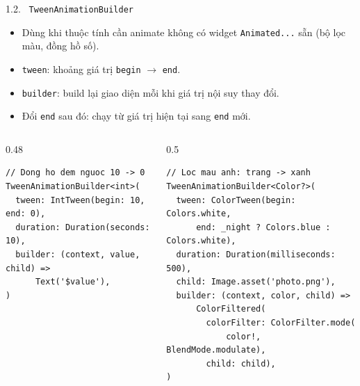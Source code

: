 \documentclass[aspectratio=169,10pt]{beamer}
\begin{document}
\begin{frame}[fragile]{1.2. \texttt{ TweenAnimationBuilder}}
  \begin{itemize}
    \item Dùng khi thuộc tính cần animate không có widget \texttt{Animated...} sẵn
          (bộ lọc màu, đồng hồ số).
    \item \texttt{tween}: khoảng giá trị \texttt{begin} $\rightarrow$ \texttt{end}.
    \item \texttt{builder}: build lại giao diện mỗi khi giá trị nội suy thay đổi.
    \item Đổi \texttt{end} sau đó: chạy từ giá trị hiện tại sang \texttt{end} mới.
  \end{itemize}
  \begin{columns}[T]
  \begin{column}{0.48\textwidth}
\begin{lstlisting}[frame=single,
  basicstyle=\fontfamily{phv}\selectfont\footnotesize]
// Dong ho dem nguoc 10 -> 0
TweenAnimationBuilder<int>(
  tween: IntTween(begin: 10, end: 0),
  duration: Duration(seconds: 10),
  builder: (context, value, child) =>
      Text('$value'),
)
\end{lstlisting}
  \end{column}
  \begin{column}{0.5\textwidth}
\begin{lstlisting}[frame=single,
  basicstyle=\fontfamily{phv}\selectfont\footnotesize]
// Loc mau anh: trang -> xanh
TweenAnimationBuilder<Color?>(
  tween: ColorTween(begin: Colors.white,
      end: _night ? Colors.blue : Colors.white),
  duration: Duration(milliseconds: 500),
  child: Image.asset('photo.png'),
  builder: (context, color, child) =>
      ColorFiltered(
        colorFilter: ColorFilter.mode(
            color!, BlendMode.modulate),
        child: child),
)
\end{lstlisting}
  \end{column}
  \end{columns}
\end{frame}

\end{document}
